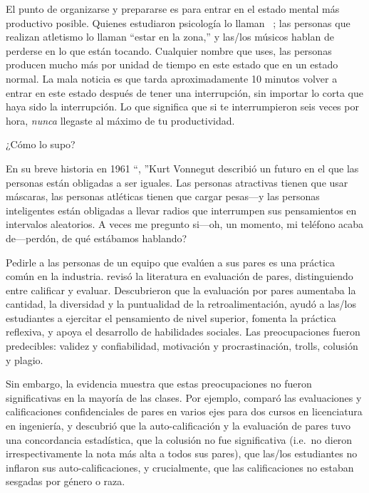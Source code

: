 El punto de organizarse y prepararse es
para entrar en el estado mental más productivo posible.
Quienes estudiaron psicología lo llaman ~\cite{Csik2008};
las personas que realizan atletismo lo llaman ``estar en la zona,''
y las/los músicos hablan de perderse en lo que están tocando.
Cualquier nombre que uses,
las personas producen mucho más por unidad de tiempo en este estado que en un estado normal.
La mala noticia es que
tarda aproximadamente 10 minutos volver a entrar en este estado después de tener una interrupción,
sin importar lo corta que haya sido la interrupción.
Lo que significa que si te interrumpieron seis veces por hora,
\emph{nunca} llegaste al máximo de tu productividad.

\newpage

\begin{aside}{¿Cómo lo supo?}

  En su breve historia en 1961 ``, ''Kurt Vonnegut describió un futuro en el que las personas están obligadas a ser iguales.
  Las personas atractivas tienen que usar máscaras,
  las personas atléticas tienen que cargar pesas---y las personas inteligentes
  están obligadas a llevar radios que interrumpen sus pensamientos en intervalos aleatorios.
  A veces me pregunto si---oh, un momento, mi teléfono acaba de---perdón, de qué estábamos hablando?

\end{aside}


Pedirle a las personas de un equipo que evalúen a sus pares es una práctica común en la industria.
\cite{Sond2012} revisó la literatura en evaluación de pares,
distinguiendo entre calificar y evaluar.
Descubrieron que la evaluación por pares aumentaba la cantidad, la diversidad y la puntualidad de la retroalimentación,
ayudó a las/los estudiantes a ejercitar el pensamiento de nivel superior,
fomenta la práctica reflexiva,
y apoya el desarrollo de habilidades sociales.
Las preocupaciones fueron predecibles:
validez y confiabilidad,
motivación y procrastinación,
trolls, colusión y plagio.

Sin embargo,
la evidencia muestra que estas preocupaciones no fueron significativas en la mayoría de las clases.
Por ejemplo,
\cite{Kauf2000} comparó las evaluaciones y calificaciones confidenciales de pares en varios ejes
para dos cursos en licenciatura en ingeniería,
y descubrió que la auto-calificación y la evaluación de pares tuvo una concordancia estadística,
que la colusión no fue significativa (i.e.\ no dieron irrespectivamente la nota más alta a todos sus pares),
que las/los estudiantes no inflaron sus auto-calificaciones,
y crucialmente,
que las calificaciones no estaban sesgadas por género o raza.

